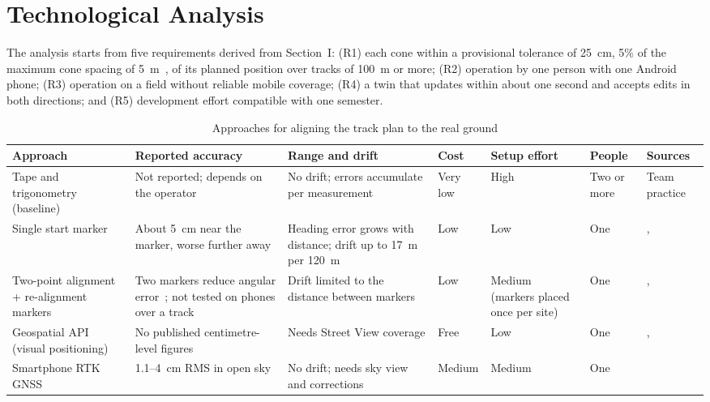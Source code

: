 \section{Technological Analysis}
The analysis starts from five requirements derived from Section~I: (R1) each cone within a provisional tolerance of 25~cm, 5\% of the maximum cone spacing of 5~m~\cite{fsds2026}, of its planned position over tracks of 100~m or more; (R2) operation by one person with one Android phone; (R3) operation on a field without reliable mobile coverage; (R4) a twin that updates within about one second and accepts edits in both directions; and (R5) development effort compatible with one semester.

\begin{table}[!t]
\caption{Approaches for aligning the track plan to the real ground}
\label{tab:alignment}
\centering
\footnotesize
\setlength{\tabcolsep}{4pt}
\renewcommand{\arraystretch}{1.15}
\begin{tabular}{|L{0.15\textwidth}|L{0.17\textwidth}|L{0.18\textwidth}|L{0.09\textwidth}|L{0.13\textwidth}|L{0.08\textwidth}|L{0.07\textwidth}|}
\hline
\textbf{Approach} & \textbf{Reported accuracy} & \textbf{Range and drift} & \textbf{Cost} & \textbf{Setup effort} & \textbf{People} & \textbf{Sources} \\ \hline
Tape and trigonometry (baseline) & Not reported; depends on the operator & No drift; errors accumulate per measurement & Very low & High & Two or more & Team practice \\ \hline
Single start marker & About 5~cm near the marker, worse further away & Heading error grows with distance; drift up to 17~m per 120~m & Low & Low & One & \cite{chalhoub2019}, \cite{feigl2020} \\ \hline
Two-point alignment + re-alignment markers & Two markers reduce angular error~\cite{nunes2023}; not tested on phones over a track & Drift limited to the distance between markers & Low & Medium (markers placed once per site) & One & \cite{nunes2023}, \cite{chalhoub2019} \\ \hline
Geospatial API (visual positioning) & No published centimetre-level figures & Needs Street View coverage & Free & Low & One & \cite{arcoregeo}, \cite{skabek2026} \\ \hline
Smartphone RTK GNSS & 1.1--4~cm RMS in open sky & No drift; needs sky view and corrections & Medium & Medium & One & \cite{jiang2023} \\ \hline
\end{tabular}
\end{table}

